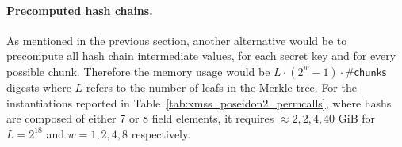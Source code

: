 \renewcommand\arraystretch{1.25}
\begin{table}[htbp]
	\centering
	\caption{}
\end{table}


\newpage

\paragraph{Precomputed hash chains.}
As mentioned in the previous section, another alternative would be to precompute all hash chain intermediate values, for each secret key and for every possible chunk.
Therefore the memory usage would be $L \cdot (2^w-1) \cdot \#\mathsf{chunks}$ digests where $L$ refers to the number of leafs in the Merkle tree.
For the instantiations reported in Table~\ref{tab:xmss_poseidon2_permcalls}, where hashs are composed of either 7 or 8 field elements, it requires $\approx 2, 2, 4, 40$ GiB for $L= 2^{18}$ and $w = 1, 2, 4, 8$ respectively.

